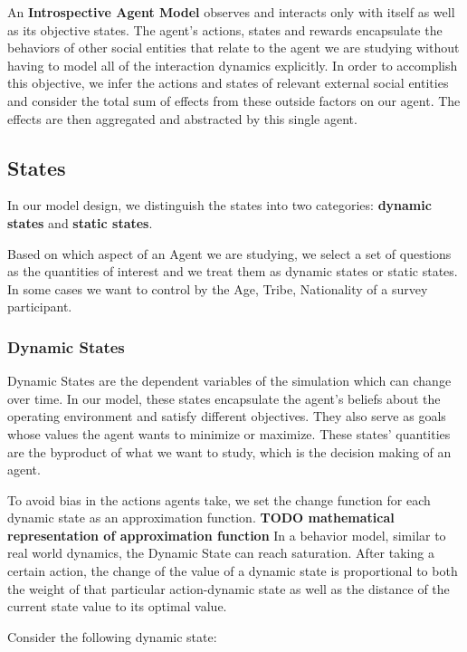 {An \textbf{Introspective Agent Model} observes and interacts only with itself as well as its objective states. The agent's actions, states and rewards encapsulate the behaviors of other social entities that relate to the agent we are studying without having to model all of the interaction dynamics explicitly. In order to accomplish this objective, we infer the actions and states of relevant external social entities and consider the total sum of effects from these outside factors on our agent. The effects are then aggregated and abstracted by this single agent.

\subsection{States}

In our model design, we distinguish the states into two categories: \textbf{dynamic states} and \textbf{static states}. 


Based on which aspect of an Agent we are studying, we select a set of questions as the quantities of interest and we treat them as dynamic states or static states. In some cases we want to control by the Age, Tribe, Nationality of a survey participant. 




\subsubsection{Dynamic States}\label{sec:dynamicstates}
Dynamic States are the dependent variables of the simulation which can change over time. In our model, these states encapsulate the agent's beliefs about the operating environment and satisfy different objectives. They also serve as goals whose values the agent wants to minimize or maximize. These states' quantities are the byproduct of what we want to study, which is the decision making of an agent. 

To avoid bias in the actions agents take, we set the change function for each dynamic state as an approximation function. 
\textbf{TODO mathematical representation of approximation function} In a behavior model, similar to real world dynamics, the Dynamic State can reach saturation. After taking a certain action, the change of the value of a dynamic state is proportional to both the weight of that particular action-dynamic state as well as the distance of the current state value to its optimal value.

Consider the following dynamic state:

}
